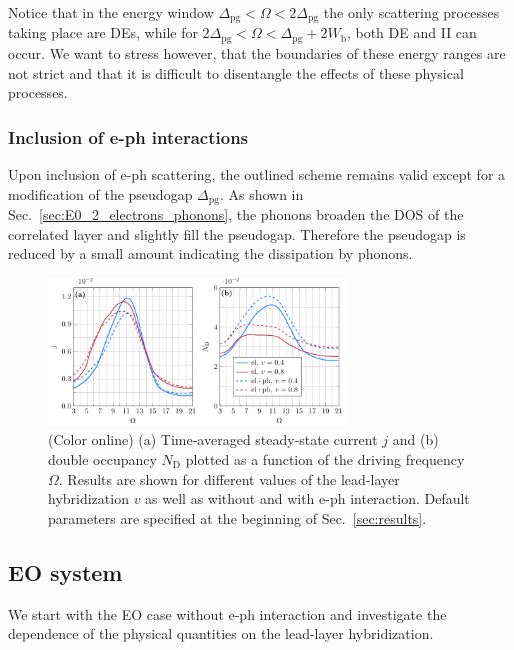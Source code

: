 \documentclass[aps,prb,groupedaddress,showpacs,twocolumn,superscriptaddress,10pt]{revtex4-2}
\begin{document}
Notice that in the energy window $\Delta_{\text{pg}}<\Omega<2\Delta_{\text{pg}}$ the only scattering processes taking place are DEs, while for $2\Delta_{\text{pg}}<\Omega<\Delta_{\text{pg}}+2W_{\text{b}}$, both DE and II can occur. We want to stress however, that the boundaries of these energy ranges are not strict and that it is difficult to disentangle the effects of these physical processes.

\subsubsection{Inclusion of e-ph interactions}
\label{sec:scheme_electrons_phonons}  

Upon inclusion of e-ph scattering, the outlined scheme remains valid except for a modification of the pseudogap $\Delta_{\text{pg}}$. As shown in Sec.~\ref{sec:E0_2_electrons_phonons}, the phonons broaden the DOS of the correlated layer and slightly fill the pseudogap. 
Therefore the pseudogap is reduced by a small amount indicating the dissipation by phonons.
 
\begin{figure}[t]
\includegraphics[width=0.7\textwidth]{./figures_Paper1/j_vs_omega_mu1_v_0.4_0.8_eph.pdf}
\caption{(Color online) 
 (a) Time-averaged steady-state current $j$ and (b) double occupancy $N_{\text{D}}$ plotted as a function of the driving frequency $\Omega$. Results are shown for different values of the lead-layer hybridization $v$ as well as without and with e-ph interaction.
 Default parameters are specified at the beginning of Sec.~\ref{sec:results}.} 
\label{fig:j_vs_omega_mu1_v_0.4_0.8_eph}
\end{figure}
 
 
\subsection{EO system}
\label{sec:E0_2_only_electrons} 

We start with the EO case without e-ph interaction and investigate the dependence of the physical quantities on the lead-layer hybridization.
\end{document}
